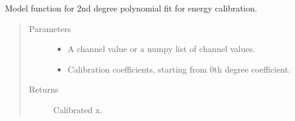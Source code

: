 \documentclass[letterpaper,10pt,english]{sphinxmanual}
\begin{document}
\begin{fulllineitems}
\label{\detokenize{autodocs/data:listmode.data.poly2}}
\sphinxAtStartPar
Model function for 2nd degree polynomial fit for energy calibration.
\begin{quote}\begin{description}
\item[{Parameters}] \leavevmode\begin{itemize}
\item {} 
\sphinxAtStartPar
{} \textendash{} A channel value or a numpy list of channel values.

\item {} 
\sphinxAtStartPar
{} \textendash{} Calibration coefficients, starting from 0th degree coefficient.

\end{itemize}

\item[{Returns}] \leavevmode
\sphinxAtStartPar
Calibrated x.

\end{description}\end{quote}

\end{fulllineitems}

\end{document}
